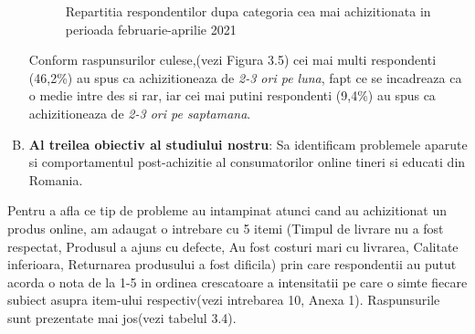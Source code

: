 \documentclass[a4paper, 12pt]{article}
\begin{document}
\begin{enumerate}[(A)]
\begin{figure}[!htb]
			\caption{Repartitia respondentilor dupa categoria cea mai achizitionata in perioada februarie-aprilie 2021} 
		\end{figure}
	
\newpage
		\qquad Conform raspunsurilor culese,(vezi Figura 3.5) cei mai multi respondenti (46,2\%) au spus ca achizitioneaza de \textit{2-3 ori pe luna}, fapt ce se incadreaza ca o medie intre des si rar, iar cei mai putini respondenti (9,4\%) au spus ca achizitioneaza de \textit{2-3 ori pe saptamana}.
\bigskip	
		\item \textbf{Al treilea obiectiv al studiului nostru}: Sa identificam problemele aparute si comportamentul post-achizitie al consumatorilor online tineri si educati din Romania.
\end{enumerate}		
		\quad Pentru a afla ce tip de probleme au intampinat atunci cand au achizitionat un produs online, am adaugat o intrebare cu 5 itemi (Timpul de livrare nu a fost respectat, Produsul a ajuns cu defecte, Au fost costuri mari cu livrarea, Calitate inferioara, Returnarea produsului a fost dificila) prin care respondentii au putut acorda o nota de la 1-5 in ordinea crescatoare a intensitatii pe care o simte fiecare subiect asupra item-ului respectiv(vezi intrebarea 10, Anexa 1). Raspunsurile sunt prezentate mai jos(vezi tabelul 3.4).
	\newline
	
\end{document}
